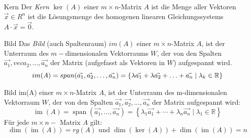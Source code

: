 \begin{definition}{Kern}
    Der \textit{Kern} $\ker(A)$ einer $m\times n$-Matrix $A$ ist die Menge aller 
    Vektoren $\vec{x}\in R^n$ ist die Lösungsmenge des homogenen linearen Gleichungssystems
    $A\cdot\vec{x}=\vec{0}$.
\end{definition}

\begin{definition}{Bild}
    Das \textit{Bild} (auch Spaltenraum) $im(A)$ einer $m\times n$-Matrix $A$,
    ist der Unterraum des $m-$dimensionalen Vektorraums $W$, der von den Spalten
    $\vec{a_1}, vec{a_2}, \ldots, \vec{a_n}$ der Matrix (aufgefasst als Vektoren in $W$) aufgespannt wird.
    \begin{equation*}
        im(A)=span(\vec{a_1}, \vec{a_2}, \ldots, \vec{a_n})
        = \{\lambda\vec{a_1}+\lambda\vec{a_2}+\ldots+\vec{a_n}\mid \lambda_k\in\mathbb{R}\}
    \end{equation*}
\end{definition}





\begin{definition}{Bild im(A)}
    einer $m \times n$-Matrix $A$, ist der Unterraum des m-dimensionalen Vektorraum $W$, der von den Spalten $\overrightarrow{a_{1}}, \overrightarrow{a_{2}}, \ldots, \overrightarrow{a_{n}}$ der Matrix aufgespannt wird:
    $$
    \operatorname{im}(A)=\operatorname{span}\left(\overrightarrow{a_{1}}, \ldots, \overrightarrow{a_{n}}\right)=\left\{\lambda_{1} \overrightarrow{a_{1}}+\cdots+\lambda_{n} \overrightarrow{a_{n}} \mid \lambda_{1} \in \mathbb{R}\right\}
    $$
    Für jede $m \times n-$ Matrix $A$ gilt:
    $$
    \operatorname{dim}(\operatorname{im}(A))=r g(A) \text { und } \operatorname{dim}(\operatorname{ker}(A))+\operatorname{dim}(\operatorname{im}(A))=n
    $$  
\end{definition}

